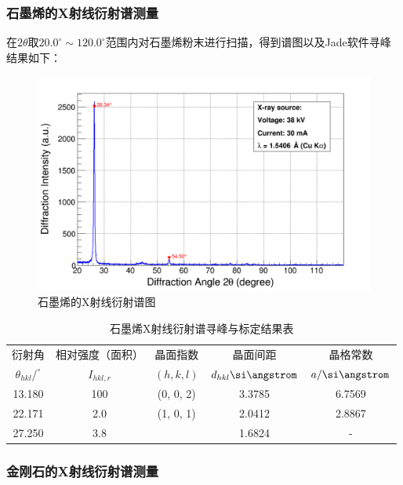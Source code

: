 \documentclass{thuemp}
\begin{document}
\subsubsection{石墨烯的X射线衍射谱测量}

在$2\theta$取$20.0^\circ \sim 120.0^\circ$范围内对石墨烯粉末进行扫描，得到谱图以及Jade软件寻峰结果如下： 

\begin{figure}[H]
    \centering
    \includegraphics[width=0.8\linewidth]{../Data/C-Graphene-multi.png}
    \caption{石墨烯的X射线衍射谱图}
    \label{fig:graphene_xrd}
\end{figure}

\begin{table}
    \centering
    \captionnamefont{\wuhao\bf\heiti}
    \captiontitlefont{\wuhao\bf\heiti}
    \caption{石墨烯X射线衍射谱寻峰与标定结果表}
    \label{tab:graphene_xrd}
    \liuhao
    \begin{tabular}{ccccc}
        \toprule
        衍射角 & 相对强度（面积）& 晶面指数 & 晶面间距 & 晶格常数 \\
        $\theta_{hkl}/^\circ$ & $I_{hkl,r}$ & $(h,k,l)$ & $d_{hkl}\text{\si\angstrom}$ & $a/\text{\si\angstrom}$\\
        \midrule
        13.180 & 100& (0, 0, 2)& 3.3785 & 6.7569 \\
        22.171 & 2.0& (1, 0, 1)& 2.0412 & 2.8867 \\
        27.250 & 3.8&          & 1.6824 &    -   \\
        \bottomrule
    \end{tabular}
\end{table}



\subsubsection{金刚石的X射线衍射谱测量}
\end{document}
